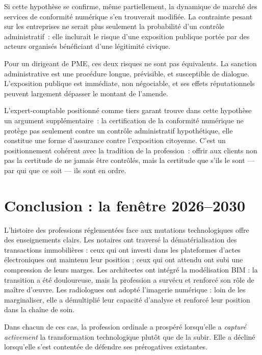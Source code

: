 \documentclass[12pt,a4paper]{article}
\begin{document}
Si cette hypothèse se confirme, même partiellement, la dynamique de marché des services de conformité numérique s'en trouverait modifiée. La contrainte pesant sur les entreprises ne serait plus seulement la probabilité d'un contrôle administratif~: elle inclurait le risque d'une exposition publique portée par des acteurs organisés bénéficiant d'une légitimité civique.

Pour un dirigeant de PME, ces deux risques ne sont pas équivalents. La sanction administrative est une procédure longue, prévisible, et susceptible de dialogue. L'exposition publique est immédiate, non négociable, et ses effets réputationnels peuvent largement dépasser le montant de l'amende.

L'expert-comptable positionné comme tiers garant trouve dans cette hypothèse un argument supplémentaire~: la certification de la conformité numérique ne protège pas seulement contre un contrôle administratif hypothétique, elle constitue une forme d'assurance contre l'exposition citoyenne. C'est un positionnement cohérent avec la tradition de la profession~: offrir aux clients non pas la certitude de ne jamais être contrôlés, mais la certitude que s'ils le sont --- par qui que ce soit --- ils sont en ordre.

\section{Conclusion : la fenêtre 2026--2030}

L'histoire des professions réglementées face aux mutations technologiques offre des enseignements clairs. Les notaires ont traversé la dématérialisation des transactions immobilières : ceux qui ont investi dans les plateformes d'actes électroniques ont maintenu leur position ; ceux qui ont attendu ont subi une compression de leurs marges. Les architectes ont intégré la modélisation BIM : la transition a été douloureuse, mais la profession a survécu et renforcé son rôle de maître d'œuvre. Les radiologues ont adopté l'imagerie numérique : loin de les marginaliser, elle a démultiplié leur capacité d'analyse et renforcé leur position dans la chaîne de soin.

Dans chacun de ces cas, la profession ordinale a prospéré lorsqu'elle a \emph{capturé activement} la transformation technologique plutôt que de la subir. Elle a décliné lorsqu'elle s'est contentée de défendre ses prérogatives existantes.
\end{document}
